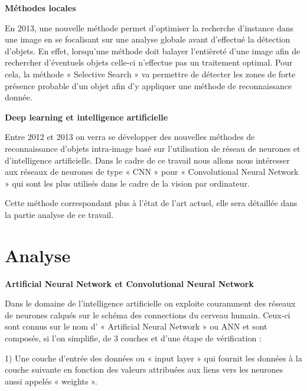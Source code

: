 \documentclass[a4paper,12pt]{article} %
\begin{document}
\newpage
\textbf{Méthodes locales}\newline
\par
En 2013, une nouvelle méthode permet d’optimiser la recherche d’instance dans une image en se focalisant sur une analyse globale avant d'effectué la détection d'objets. En effet, lorsqu’une méthode doit balayer l’entièreté d’une image afin de rechercher d’éventuels objets celle-ci n’effectue pas un traitement optimal. Pour cela, la méthode « Selective Search » va permettre de détecter les zones de forte présence probable d’un objet afin d’y appliquer une méthode de reconnaissance donnée. \newline

\textbf{Deep learning et intelligence artificielle}\newline
\par
Entre 2012 et 2013 on verra se développer des nouvelles méthodes de reconnaissance d’objets intra-image basé sur l’utilisation de réseau de neurones et d’intelligence artificielle. Dans le cadre de ce travail nous allons nous intéresser aux réseaux de neurones de type « CNN » pour « Convolutional Neural Network » qui sont les plus utilisés dans le cadre de la vision par ordinateur.\newline
\par
Cette méthode correspondant plus à l’état de l’art actuel, elle sera détaillée dans la partie analyse de ce travail.  \newline

\newpage
\section{Analyse} %

\textbf{Artificial Neural Network et Convolutional Neural Network}\newline
\par
Dans le domaine de l’intelligence artificielle on exploite couramment des réseaux de neurones calqués sur le schéma des connections du cerveau humain. Ceux-ci sont connus sur le nom d’ « Artificial Neural Network » ou ANN et sont composés, si l’on simplifie, de 3 couches et d'une étape de vérification :\newline

1)	Une couche d’entrée des données ou « input layer » qui fournit les données à la couche suivante en fonction des valeurs attribuées aux liens vers les neurones aussi appelés « weights ».\newline
\end{document}
